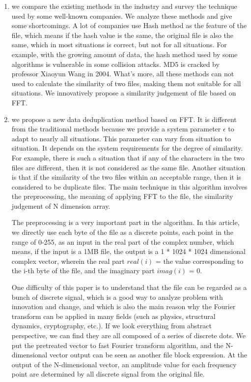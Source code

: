 \begin{englishabstract}
\begin{enumerate}
    \item we compare the existing methods in the industry and survey the technique used by some well-known companies. We analyze these methods and give some shortcomings. A lot of companies use Hash method as the feature of the file, which means if the hash value is the same, the original file is also the same, which in most situations is correct, but not for all situations. For example, with the growing amount of data, the hash method used by some algorithms is vulnerable in some collision attacks. MD5 is cracked by professor Xiaoyun Wang in 2004. What's more, all these methods can not used to calculate the similarity of two files, making them not suitable for all situations. We innovatively propose a similarity judgement of file based on FFT.

    \item we propose a new data deduplication method based on FFT. It is different from the traditional methods because we provide a system parameter $\epsilon$ to adapt to nearly all situations. This parameter can vary from situation to situation. It depends on the system requirements for the degree of similarity. For example, there is such a situation that if any of the characters in the two files are different, then it is not considered as the same file. Another situation is that if the similarity of the two files within an acceptable range, then it is considered to be duplicate files. The main technique in this algorithm involves the preprocessing, the meaning of applying FFT to the file, the similarity judgement of N dimension array. 
        
        The preprocessing is a very important part in the algorithm. In this article, we directly use each byte of the file as a discrete points, each point in the range of 0-255, as an input in the real part of the complex number, which means, if the input is a 1MB file, the output is a 1 * 1024 * 1024 dimensional complex vector, wherein the real part $real(i)$ = the value corresponding to the i-th byte of the file, and the imaginary part $imag(i)$ = 0. 
        
        One difficulty of this paper is to understand that the file can be regarded as a bunch of discrete signal, which is a good way to analyze problem with innovation and change, and which is also the main reason why the Fourier transform can be applied in many fields (such as physics, structural dynamics, cryptography, etc.). If we look everything from abstract perspective, we can find they are all composed of a series of discrete dots. We put the pretreated vector to fast Fourier transform algorithm, and the N-dimensional vector output can be seen as another file block expression. At the output of the N-dimensional vector, an amplitude value for each frequency point are determined by all discrete signal from the original file. 
        

\end{enumerate}
\end{englishabstract}
